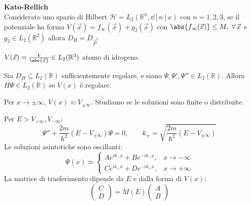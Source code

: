 \begin{theorem}
    \label{theo: Kato-Rellich}
    {\normalfont\textbf{Kato-Rellich}}\\
    Considerato uno spazio di Hilbert \(\mathcal{H}= L_2(\mathbb{R}^n , \dd[n]{x})\) con \(n = 1,2,3\), 
    se il potenziale ha forma \(V(\vec{x})= f_{\infty}(\vec{x})+ g_2(\vec{x})\)  con \(\abs{f_\infty(\vec{x})}\leq M , \ \forall\, \vec{x}\)
    e \(g_2 \in L_2(\mathbb{R}^2)\) allora \(D_H = D_{\vec{P}^2}\)
\end{theorem}
\begin{example}
    \(V(\vec{x})= \frac{k}{\abs{\vec{x}}} \in L_2(\mathbb{R}^3)\) atomo di idrogeno. 
\end{example}


Sia \( D_H \subseteq L_2(\mathbb{R}) \) sufficientemente regolare, e siano \(\Psi, \Psi', \Psi'' \in L_2(\mathbb{R})\).  
Allora \(H\Psi \in L_2(\mathbb{R})\) se \(V(x)\) è regolare.

Per \(x \to \pm\infty\), \(V(x) \approx V_{\pm\infty}\).  
Studiamo se le soluzioni sono finite o distribuite.

Per \(E > V_{+\infty}, V_{-\infty}\):
\[
\Psi'' + \frac{2m}{\hbar^2}(E - V_{\pm\infty})\Psi = 0, \qquad
k_\pm = \sqrt{\frac{2m}{\hbar^2}(E - V_{\pm\infty})}
\]
Le soluzioni asintotiche sono oscillanti:
\[
\Psi(x) \simeq 
\begin{cases}
A e^{i k_- x} + B e^{-i k_- x}, & x \to -\infty \\
C e^{i k_+ x} + D e^{-i k_+ x}, & x \to +\infty
\end{cases}
\]
La matrice di trasferimento dipende da \(E\) e dalla forma di \(V(x)\):
\[
\begin{pmatrix}
C \\ D
\end{pmatrix}
= M(E)
\begin{pmatrix}
A \\ B
\end{pmatrix}
\]

